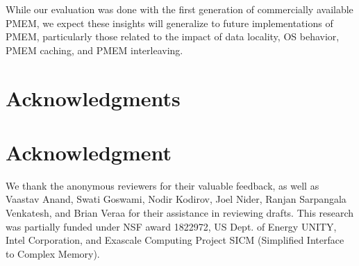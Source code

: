 \documentclass[10pt,journal,compsoc]{IEEEtran}
\begin{document}
While our evaluation was done with the first generation of commercially available PMEM, we expect these insights will generalize to future implementations of PMEM, particularly those related to the impact of data locality, OS behavior, PMEM caching, and PMEM interleaving.


\ifCLASSOPTIONcompsoc
  \section*{Acknowledgments}
\else
  \section*{Acknowledgment}
\fi

We thank the anonymous reviewers for their valuable feedback, as well as Vaastav Anand, Swati Goswami, Nodir Kodirov, Joel Nider, Ranjan Sarpangala Venkatesh, and Brian Veraa for their assistance in reviewing drafts. This research was partially funded under NSF award 1822972, US Dept. of Energy UNITY, Intel Corporation, and Exascale Computing Project SICM (Simplified Interface to Complex Memory).

\nocite{Hunter:2007} %
\nocite{yang2019empirical} %
\nocite{peng2019system} %
\nocite{yuki2014understanding} %
\nocite{yuki2015polybench} %
\nocite{xu2016nova} %



\end{document}
